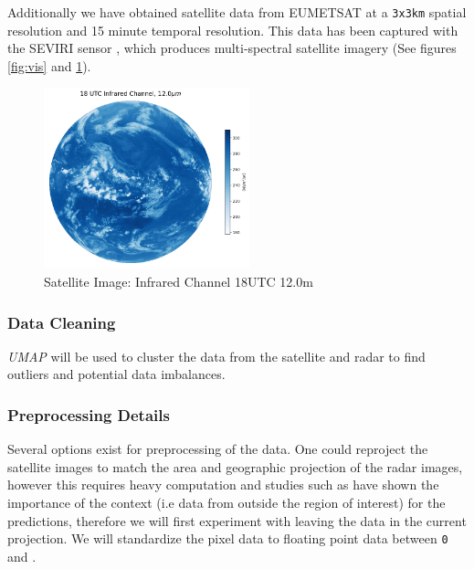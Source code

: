 \documentclass[acmtog, authorversion]{acmart}
\begin{document}
Additionally we have obtained satellite data from \textsc{EUMETSAT} at a \texttt{3x3km} spatial resolution and 15 minute temporal resolution. This data has been captured with the \textsc{SEVIRI} sensor \cite{schmid-no-date}, which produces multi-spectral satellite imagery (See figures \ref{fig:vis} and \ref{fig:infra}).

\begin{figure}[]
    \centering
    \includegraphics[width=225]{report/images/infrared.png}
    \caption{Satellite Image: Infrared Channel 18UTC 12.0\mu m}
    \label{fig:infra}
\end{figure}

\subsubsection{Data Cleaning} \textit{UMAP} \cite{mcinnes2020umap} will be used to cluster the data from the satellite and radar to find outliers and potential data imbalances.

\subsubsection{Preprocessing Details} Several options exist for preprocessing of the data. One could reproject the satellite images to match the area and geographic projection of the radar images, however this requires heavy computation and studies such as \cite{sønderby2020metnet} have shown the importance of the context (i.e data from outside the region of interest) for the predictions, therefore we will first experiment with leaving the data in the current projection. We will standardize the pixel data to floating point data between \texttt{0} and .
\end{document}
